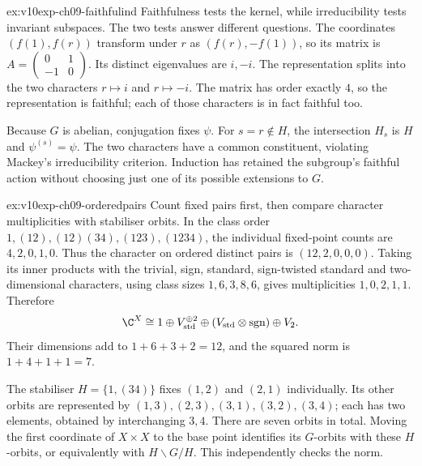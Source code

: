 \begin{solution}{ex:v10exp-ch09-faithfulind}
\idea Faithfulness tests the kernel, while irreducibility tests invariant subspaces. The two tests answer different questions.
\writeup The coordinates $(f(1),f(r))$ transform under $r$ as $(f(r),-f(1))$, so its matrix is $A=\begin{pmatrix}0&1\\-1&0\end{pmatrix}$. Its distinct eigenvalues are $i,-i$. The representation splits into the two characters $r\mapsto i$ and $r\mapsto-i$. The matrix has order exactly $4$, so the representation is faithful; each of those characters is in fact faithful too.

Because $G$ is abelian, conjugation fixes $\psi$. For $s=r\notin H$, the intersection $H_s$ is $H$ and $\psi^{(s)}=\psi$. The two characters have a common constituent, violating Mackey's irreducibility criterion. Induction has retained the subgroup's faithful action without choosing just one of its possible extensions to $G$.
\end{solution}

\begin{solution}{ex:v10exp-ch09-orderedpairs}
\idea Count fixed pairs first, then compare character multiplicities with stabiliser orbits.
\writeup In the class order $1,(12),(12)(34),(123),(1234)$, the individual fixed-point counts are $4,2,0,1,0$. Thus the character on ordered distinct pairs is $(12,2,0,0,0)$. Taking its inner products with the trivial, sign, standard, sign-twisted standard and two-dimensional characters, using class sizes $1,6,3,8,6$, gives multiplicities $1,0,2,1,1$. Therefore
\[
 \C^X\cong1\oplus V_{\mathrm{std}}^{\oplus2}
       \oplus(V_{\mathrm{std}}\otimes\operatorname{sgn})\oplus V_2.
\]
Their dimensions add to $1+6+3+2=12$, and the squared norm is $1+4+1+1=7$.

The stabiliser $H=\{1,(34)\}$ fixes $(1,2)$ and $(2,1)$ individually. Its other orbits are represented by $(1,3),(2,3),(3,1),(3,2),(3,4)$; each has two elements, obtained by interchanging $3,4$. There are seven orbits in total. Moving the first coordinate of $X\times X$ to the base point identifies its $G$-orbits with these $H$-orbits, or equivalently with $H\backslash G/H$. This independently checks the norm.
\end{solution}

